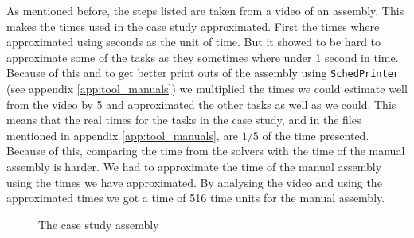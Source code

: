 As mentioned before, the steps listed are taken from a video of an assembly. This makes the times used in the case study approximated. First the times where approximated using seconds as the unit of time. But it showed to be hard to approximate some of the tasks as they sometimes where under 1 second in time. Because of this and to get better print outs of the assembly using \texttt{SchedPrinter} (see appendix \ref{app:tool_manuals}) we multiplied the times we could estimate well from the video by 5 and approximated the other tasks as well as we could. This means that the real times for the tasks in the case study, and in the files mentioned in appendix \ref{app:tool_manuals}, are $1/5$ of the time presented. Because of this, comparing the time from the solvers with the time of the manual assembly is harder. We had to approximate the time of the manual assembly using the times we have approximated. By analysing the video and using the approximated times we got a time of 516 time units for the manual assembly.

\begin{landscape}
\begin{figure}

\caption{The case study assembly}
\label{fig:assembly}
\end{figure}
\end{landscape}

%
